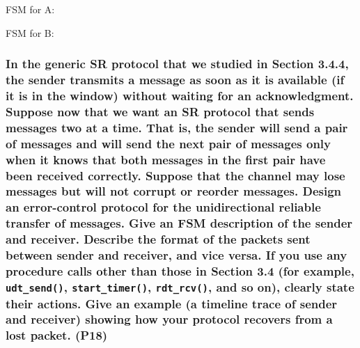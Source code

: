 FSM for A:
\begin{center}
\end{center}
FSM for B:
\begin{center}
\end{center}


\subsubsection{In the generic SR protocol that we studied in Section 3.4.4, the sender transmits a message as soon as it is available (if it is in the window) without waiting for an acknowledgment. Suppose now that we want an SR protocol that sends messages two at a time. That is, the sender will send a pair of messages and will send the next pair of messages only when it knows that both messages in the first pair have been received correctly. Suppose that the channel may lose messages but will not corrupt or reorder messages. Design an error-control protocol for the unidirectional reliable transfer of messages. Give an FSM description of the sender and receiver. Describe the format of the packets sent between sender and receiver, and vice versa. If you use any procedure calls other than those in Section 3.4  (for example, \texttt{udt\_send()}, \texttt{start\_timer()}, \texttt{rdt\_rcv()}, and so on), clearly state their actions. Give an example (a timeline trace of sender and receiver) showing how your protocol recovers from a lost packet. (P18)}

